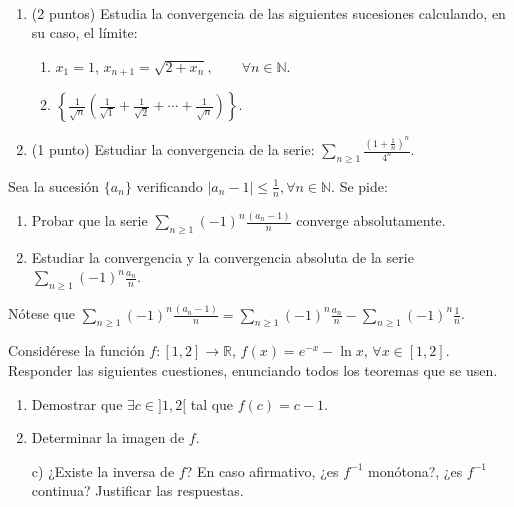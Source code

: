 \documentclass[12pt]{article}
\begin{document}
    \begin{ejercicio}~
        \begin{enumerate}
            \item (2 puntos) Estudia la convergencia de las siguientes sucesiones calculando, en su caso, el límite:
            \begin{enumerate}
                \item $x_1 = 1$, $x_{n+1} = \sqrt{2 + x_n},\qquad \forall n \in \mathbb{N}$.
                \item $\displaystyle \left\{\frac{1}{\sqrt{n}}\left(\frac{1}{\sqrt{1}} + \frac{1}{\sqrt{2}} + \cdots + \frac{1}{\sqrt{n}}\right)\right\}$.
            \end{enumerate}
            \item (1 punto) Estudiar la convergencia de la serie: $\displaystyle \sum\limits_{n\geq 1} \frac{(1 + \frac{1}{n})^n}{4^n}$.
        \end{enumerate}
    \end{ejercicio}
        
    \begin{ejercicio} [2 puntos]
        Sea la sucesión $\{a_n\}$ verificando $|a_n - 1| \leq \frac{1}{n}, \forall n \in \mathbb{N}$. Se pide:
        \begin{enumerate}
            \item Probar que la serie $\sum\limits_{n\geq 1} (-1)^n\frac{ (a_n - 1)}{n}$ converge absolutamente.
            \item Estudiar la convergencia y la convergencia absoluta de la serie $\sum\limits_{n\geq 1} (-1)^n\frac{ a_n}{n}$.
        \end{enumerate}
        \begin{observacion}
            Nótese que $\displaystyle \sum\limits_{n\geq 1} (-1)^n \frac{(a_n - 1)}{n} = \sum\limits_{n\geq 1} (-1)^n \frac{a_n}{n} - \sum\limits_{n\geq 1} (-1)^n\frac{1}{n}$.
        \end{observacion}
    \end{ejercicio}
        
        \begin{ejercicio}
        [3 puntos] Considérese la función $f : [1, 2] \to \mathbb{R}$, $f(x) = e^{-x} - \ln x$, $\forall x \in [1, 2]$. Responder las siguientes cuestiones, enunciando todos los teoremas que se usen.
        \begin{enumerate}
            \item Demostrar que $\exists c \in ]1,2[$ tal que $f(c) = c - 1$.
            \item Determinar la imagen de $f$.
            \item[c)] ¿Existe la inversa de $f$? En caso afirmativo, ¿es $f^{-1}$ monótona?, ¿es $f^{-1}$ continua? Justificar las respuestas.
        \end{enumerate}
        \end{ejercicio}
        
\end{document}
